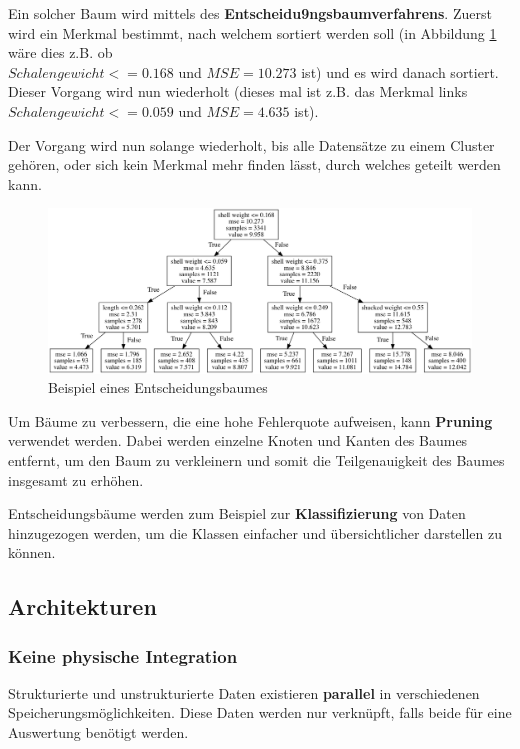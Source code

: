 \documentclass[a4paper, 11pt]{article}
\begin{document}
\vspace{10px}

\noindent Ein solcher Baum wird mittels des \textbf{Entscheidu9ngsbaumverfahrens}. Zuerst wird ein Merkmal bestimmt, nach welchem sortiert werden soll (in Abbildung \ref{fig:tree} wäre dies z.B. ob \\ 
$Schalengewicht <= 0.168$ und  $MSE = 10.273$ ist) und es wird danach sortiert. Dieser Vorgang wird nun wiederholt (dieses mal ist z.B. das Merkmal links $Schalengewicht <=0.059$ und $MSE = 4.635$ ist).

Der Vorgang wird nun solange wiederholt, bis alle Datensätze zu einem Cluster gehören, oder sich kein Merkmal mehr finden lässt, durch welches geteilt werden kann.

\begin{figure}[htb]
	\centering
	\includegraphics[keepaspectratio=true,height=13\baselineskip]{tree.png}
	\caption{Beispiel eines Entscheidungsbaumes}
	\label{fig:tree}
\end{figure}

Um Bäume zu verbessern, die eine hohe Fehlerquote aufweisen, kann \textbf{Pruning} verwendet werden. Dabei werden einzelne Knoten und Kanten des Baumes entfernt, um den Baum zu verkleinern und somit die Teilgenauigkeit des Baumes insgesamt zu erhöhen.

\vspace{10px}

\noindent Entscheidungsbäume werden zum Beispiel zur \textbf{Klassifizierung} von Daten hinzugezogen werden, um die Klassen einfacher und übersichtlicher darstellen zu können.

\newpage

\subsection{Architekturen}
\subsubsection{Keine physische Integration}
Strukturierte und unstrukturierte Daten existieren \textbf{parallel} in verschiedenen Speicherungsmöglichkeiten. Diese Daten werden nur verknüpft, falls beide für eine Auswertung benötigt werden.
\end{document}

